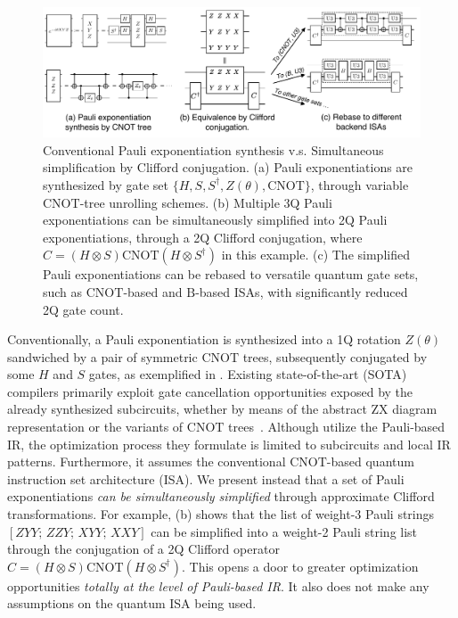 \documentclass[conference,9pt]{IEEEtran}
\newcommand{\CNOT}{\mathrm{CNOT}}
\begin{document}
    \begin{figure}[tbp]
        \centering   \includegraphics[width=\columnwidth]{figures/motivation.pdf}
        \caption{Conventional Pauli exponentiation synthesis v.s. Simultaneous simplification by Clifford conjugation. (a) Pauli exponentiations are synthesized by gate set $ \{ H, S, S^\dagger, Z(\theta), \CNOT \} $, through variable $ \CNOT $-tree unrolling schemes. (b) Multiple 3Q Pauli exponentiations can be simultaneously simplified into 2Q Pauli exponentiations, through a 2Q Clifford conjugation, where $ C = (H\otimes S) \CNOT (H\otimes S^\dagger) $ in this example. (c) The simplified Pauli exponentiations can be rebased to versatile quantum gate sets, such as $ \CNOT $-based and $ \mathrm{B} $-based ISAs, with significantly reduced 2Q gate count.}
        \label{fig:motivation}
        
    \end{figure}

    Conventionally, a Pauli exponentiation is synthesized into a 1Q rotation $ Z(\theta) $ sandwiched by a pair of symmetric $ \CNOT $ trees, subsequently conjugated by some $ H $ and $ S $ gates, as exemplified in . Existing state-of-the-art (SOTA) compilers primarily exploit gate cancellation opportunities exposed by the already synthesized subcircuits, whether by means of the abstract ZX diagram~\cite{cowtan2019phase,van2023towards,paykin2023pcoast} representation or the variants of $ \CNOT $ trees~\cite{li2022paulihedral,jin2024tetris}. Although utilize the Pauli-based IR, the optimization process they formulate is limited to subcircuits and local IR patterns. Furthermore, it assumes the conventional $ \CNOT $-based quantum instruction set architecture (ISA). We present instead that a set of Pauli exponentiations \emph{can be simultaneously simplified} through approximate Clifford transformations. For example,  (b) shows that the list of weight-3 Pauli strings $ [ZYY;\, ZZY;\, XYY;\, XXY] $ can be simplified into a weight-2 Pauli string list through the conjugation of a 2Q Clifford operator $ C = (H\otimes S) \CNOT (H\otimes S^\dagger) $. This opens a door to greater optimization opportunities \emph{totally at the level of Pauli-based IR}. It also does not make any assumptions on the quantum ISA being used.
\end{document}
